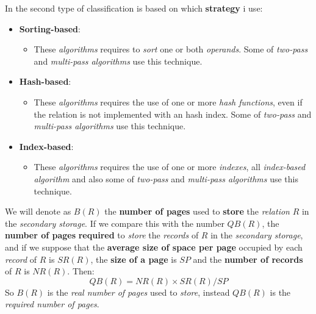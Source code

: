 \documentclass{article}
\begin{document}
In the second type of classification is based on which \textbf{strategy} i use:
\begin{itemize}
\item \textbf{Sorting-based}:
\begin{itemize}
\item These \emph{algorithms} requires to \emph{sort} one or both \emph{operands}. Some of \emph{two-pass} and \emph{multi-pass algorithms} use this technique. 
\end{itemize}
\item \textbf{Hash-based}:
\begin{itemize}
\item These \emph{algorithms} requires the use of one or more \emph{hash functions}, even if the relation is not implemented with an hash index. Some of \emph{two-pass} and \emph{multi-pass algorithms} use this technique. 
\end{itemize}
\item \textbf{Index-based}:
\begin{itemize}
\item These \emph{algorithms} requires the use of one or more \emph{indexes}, all \emph{index-based algorithm} and also some of \emph{two-pass} and \emph{multi-pass algorithms} use this technique. 
\end{itemize}
\end{itemize}
We will denote as $B(R)$ the \textbf{number of pages} used to \textbf{store} the \emph{relation} $R$ in the \emph{secondary storage}. If we compare this with the number $QB(R)$, the \textbf{number of pages} \textbf{required} to \emph{store} the \emph{records} of $R$ in the \emph{secondary storage}, and if we suppose that the \textbf{average size of space per page} occupied by each \emph{record} of $R$ is $SR(R)$, the \textbf{size of a page} is $SP$ and the \textbf{number of records} of $R$ is $NR(R)$. Then:
\[QB(R) = NR(R) \times SR(R) / SP\]
So $B(R)$ is the \emph{real number of pages} used to \emph{store}, instead $QB(R)$ is the \emph{required number of pages}.
\end{document}
